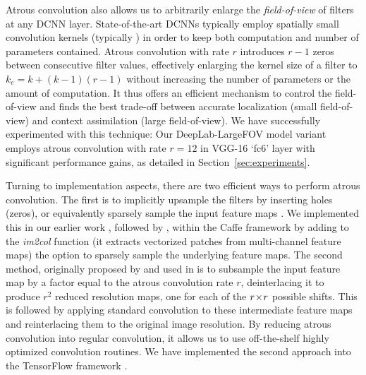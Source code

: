 Atrous convolution also allows us to arbitrarily enlarge the \emph{field-of-view} of
filters at any DCNN layer.
State-of-the-art DCNNs typically employ spatially small
convolution kernels (typically ) in order to keep both computation and
number of parameters contained. Atrous convolution with rate $r$ introduces
$r-1$ zeros between consecutive filter values, effectively enlarging the kernel
size of a  filter to $k_e = k + (k-1)(r-1)$ without increasing the
number of parameters or the amount of computation. It thus offers an efficient
mechanism to control the field-of-view and finds the best trade-off between
accurate localization (small field-of-view) and context assimilation (large
field-of-view). We have successfully experimented with this technique:
Our DeepLab-LargeFOV model variant \cite{chen2014semantic} employs atrous
convolution with rate $r = 12$ in VGG-16 `fc6' layer with significant
performance gains, as detailed in Section~\ref{sec:experiments}.

Turning to implementation aspects, 
there are two efficient ways to  perform atrous convolution. The first
is to implicitly upsample the filters by inserting holes (zeros), or
equivalently sparsely sample the input feature maps \cite{holschneider1989real}.
We implemented this in our earlier work \cite{papandreou2014untangling,
 chen2014semantic}, followed by \cite{yu2015multi}, within the Caffe framework
\cite{jia2014caffe} by adding to the \textsl{im2col} function (it extracts
vectorized patches from multi-channel feature maps) the option to sparsely
sample the underlying feature maps. The second method, originally proposed by
\cite{shensa1992discrete} and used in \cite{giusti2013fast, sermanet2013overfeat}
is to subsample the input feature map by a factor equal to the atrous
convolution rate $r$, deinterlacing it to produce $r^2$ reduced resolution maps,
one for each of the $r \! \times \! r$ possible shifts. This is followed by applying
standard convolution to these intermediate feature maps and reinterlacing them
to the original image resolution. By reducing atrous convolution into regular
convolution, it allows us to use off-the-shelf highly optimized convolution
routines. We have implemented the second approach into the TensorFlow framework
\cite{abadi2016tensorflow}.


